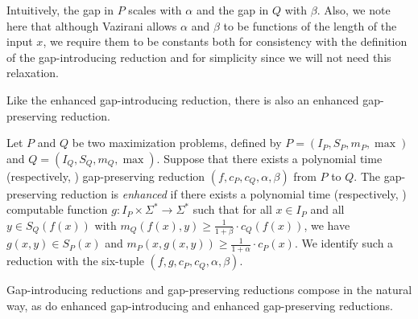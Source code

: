 \documentclass[]{article}
\begin{document}
Intuitively, the gap in $P$ scales with $\alpha$ and the gap in $Q$ with $\beta$.
Also, we note here that although Vazirani allows $\alpha$ and $\beta$ to be functions of the length of the input $x$, we require them to be constants both for consistency with the definition of the gap-introducing reduction and for simplicity since we will not need this relaxation.

Like the enhanced gap-introducing reduction, there is also an enhanced gap-preserving reduction.

\begin{definition}
  Let $P$ and $Q$ be two maximization problems, defined by $P = (I_P, S_P, m_P, \max)$ and $Q = (I_Q, S_Q, m_Q, \max)$.
  Suppose that there exists a polynomial time (respectively, \NC) gap-preserving reduction $(f, c_P, c_Q, \alpha, \beta)$ from $P$ to $Q$.
  The gap-preserving reduction is \emph{enhanced} if there exists a polynomial time (respectively, \NC) computable function $g \colon I_P \times \Sigma^* \to \Sigma^*$ such that for all $x \in I_P$ and all $y \in S_Q(f(x))$ with $m_Q(f(x), y) \geq \frac{1}{1 + \beta} \cdot c_Q(f(x))$, we have $g(x, y) \in S_P(x)$ and $m_P(x, g(x, y)) \geq \frac{1}{1 + \alpha} \cdot c_P(x)$.
  We identify such a reduction with the six-tuple $(f, g, c_P, c_Q, \alpha, \beta)$.
\end{definition}

Gap-introducing reductions and gap-preserving reductions compose in the natural way, as do enhanced gap-introducing and enhanced gap-preserving reductions.
\end{document}
